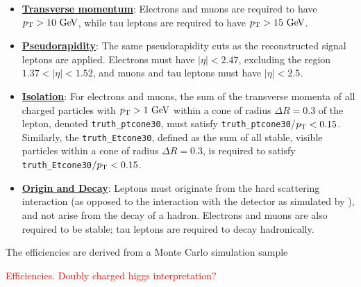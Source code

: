 \begin{itemize}
	\item \underline{\textbf{Transverse momentum}}: Electrons and muons are required to have $\pt>10 \GeV$, while tau leptons are required to have $\pt>15 \GeV$.
	\item \underline{\textbf{Pseudorapidity}}: The same pseudorapidity cuts as the reconstructed signal leptons are applied. Electrons must have $|\eta|<2.47$, excluding the region $1.37<|\eta|<1.52$, and muons and tau leptons must have $|\eta|<2.5$.
	\item \underline{\textbf{Isolation}}: For electrons and muons, the sum of the transverse momenta of all charged particles with $\pt>1 \GeV$ within a cone of radius $\Delta R=0.3$ of the lepton, denoted \texttt{truth\_ptcone30}, must satisfy \texttt{truth\_ptcone30}/$p_{\text{T}}<0.15$. Similarly, the \texttt{truth\_Etcone30}, defined as the sum of all stable, visible particles within a cone of radius $\Delta R=0.3$, is required to satisfy \texttt{truth\_Etcone30}$/p_{\text{T}}<0.15$.
	\item \underline{\textbf{Origin and Decay}}: Leptons must originate from the hard scattering interaction (as opposed to the interaction with the detector as simulated by \geant), and not arise from the decay of a hadron. Electrons and muons are also required to be stable; tau leptons are required to decay hadronically. 
\end{itemize}

The efficiencies are derived from a Monte Carlo simulation sample 

\textcolor{red}{Efficiencies. Doubly charged higgs interpretation?}